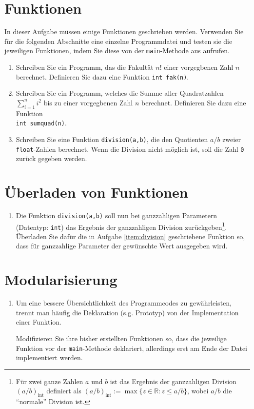 \documentclass[paper=a4, fontsize=11pt, twoside]{scrartcl}
\begin{document}
\section*{Funktionen}\label{sec:funktionen}
In dieser Aufgabe müssen einige Funktionen geschrieben werden. Verwenden Sie für die folgenden Abschnitte eine einzelne Programmdatei und testen sie die jeweiligen Funktionen, indem Sie diese von der \texttt{main}-Methode aus aufrufen.
\begin{enumerate}[resume]
\item Schreiben Sie ein Programm, das die Fakultät $n!$ einer vorgegbenen Zahl $n$ berechnet. Definieren Sie dazu eine Funktion \texttt{int fak(n)}. 
  \item Schreiben Sie ein Programm, welches die Summe aller Quadratzahlen $\sum\limits_{i=1}^{n}i^2$ bis zu einer vorgegbenen Zahl $n$ berechnet. Definieren Sie dazu eine Funktion \\ \texttt{int sumquad(n)}.
  \item Schreiben Sie eine Funktion \texttt{division(a,b)}, die den Quotienten $a/b$ zweier \texttt{float}-Zahlen berechnet. Wenn die Division nicht möglich ist, soll die Zahl \texttt{0} zurück gegeben werden.\label{item:division}
\end{enumerate}

\section*{Überladen von Funktionen}\label{sec:uberl-von-funktionen}
\begin{enumerate}[resume]
\item Die Funktion \texttt{division(a,b)} soll nun bei ganzzahligen Parametern (Datentyp: \texttt{int}) das Ergebnis der ganzzahligen Division zurückgeben\footnote{Für zwei ganze Zahlen $a$ und $b$ ist das Ergebnis der ganzzahligen Division $(a/b)_{\mathrm{int}}$ definiert als $(a/b)_{\mathrm{int}}:= \max\{z \in \mathbb{R}:z\le a/b \}$, wobei $a/b$ die ``normale'' Division ist.}. Überladen Sie dafür die in Aufgabe \ref{item:division} geschriebene Funktion so, dass für ganzzahlige Parameter der gewünschte Wert ausgegeben wird. 
\end{enumerate}

\section*{Modularisierung}\label{sec:modularisierung}
\begin{enumerate}[resume]
\item Um eine bessere Übersichtlichkeit des Programmcodes zu gewährleisten, trennt man häufig die Deklaration (s.g. Prototyp) von der Implementation einer Funktion. \par
Modifizieren Sie ihre bisher erstellten Funktionen so, dass die jeweilige Funktion vor der \texttt{main}-Methode deklariert, allerdings erst am Ende der Datei implementiert werden.
\end{enumerate}
\end{document}
